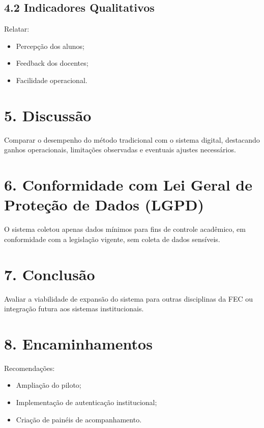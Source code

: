 \documentclass[12pt,a4paper]{article}
\begin{document}
\subsection*{4.2 Indicadores Qualitativos}

Relatar:

\begin{itemize}
    \item Percepção dos alunos;
    \item Feedback dos docentes;
    \item Facilidade operacional.
\end{itemize}


\section*{5. Discussão}

Comparar o desempenho do método tradicional com o sistema digital, destacando ganhos operacionais, limitações observadas e eventuais ajustes necessários.


\section*{6. Conformidade com Lei Geral de Proteção de Dados (LGPD)}

O sistema coletou apenas dados mínimos para fins de controle acadêmico, em conformidade com a legislação vigente, sem coleta de dados sensíveis.


\section*{7. Conclusão}

Avaliar a viabilidade de expansão do sistema para outras disciplinas da FEC ou integração futura aos sistemas institucionais.


\section*{8. Encaminhamentos}

Recomendações:

\begin{itemize}
    \item Ampliação do piloto;
    \item Implementação de autenticação institucional;
    \item Criação de painéis de acompanhamento.
\end{itemize}
\end{document}
